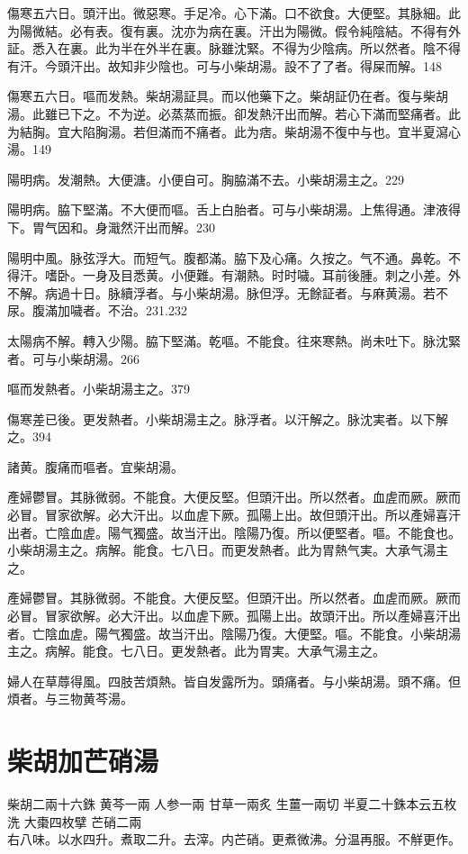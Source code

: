 傷寒五六日。頭汗出。微惡寒。手足冷。心下滿。口不欲食。大便堅。其脉細。此为陽微結。必有表。復有裏。沈亦为病在裏。汗出为陽微。假令純陰結。不得有外証。悉入在裏。此为半在外半在裏。脉雖沈緊。不得为少陰病。所以然者。陰不得有汗。今頭汗出。故知非少陰也。可与{\khaaitp 小}柴胡湯。設不了了者。得屎而解。148

傷寒五六日。嘔而发熱。柴胡湯証具。而以他藥下之。柴胡証仍在者。復与柴胡湯。此雖已下之。不为逆。必蒸蒸而振。卻发熱汗出而解。若心下滿而堅痛者。此为結胸。宜大陷胸湯。若但滿而不痛者。此为痞。柴胡{\khaaitp 湯}不復中与也。宜半夏瀉心湯。149

陽明病。发潮熱。大便溏。小便自可。胸脇滿不去。小柴胡湯主之。229

陽明病。脇下堅滿。不大便而嘔。舌上白胎者。可与小柴胡湯。上焦得通。津液得下。胃气因和。身濈然汗出而解。230

陽明中風。脉弦浮大。而短气。腹都滿。脇下及心痛。久按之。气不通。鼻乾。不得汗。嗜卧。一身及目悉黄。小便難。有潮熱。时时噦。耳前後腫。刺之小差。外不解。病過十日。脉續浮者。与{\khaaitp 小}柴胡湯。脉但浮。无餘証者。与麻黄湯。若不尿。腹滿加噦者。不治。231.232

太陽病不解。轉入少陽。脇下堅滿。乾嘔。不能食。往來寒熱。尚未吐下。脉沈緊者。可与小柴胡湯。266

嘔而发熱者。小柴胡湯主之。379

傷寒差已後。更发熱者。小柴胡湯主之。脉浮者。以汗解之。脉沈実者。以下解之。394

諸黄。腹痛而嘔者。宜柴胡湯。

產婦鬱{\khaaitp 冒}。其脉微弱。不能食。大便反堅。但頭汗出。所以然者。血虗而厥。厥而必冒。冒家欲解。必大汗出。以血虗下厥。孤陽上出。故但頭汗出。所以產婦喜汗出者。亡陰血虗。陽气獨盛。故当汗出。陰陽乃復。所以便堅者。嘔。不能食也。小柴胡湯主之。病解。能食。七八日。而更发熱者。此为胃熱气実。大承气湯主之。{\wuben}

產婦鬱冒。其脉微弱。不能食。大便反堅。但頭汗出。所以然者。血虗而厥。厥而必冒。冒家欲解。必大汗出。以血虗下厥。孤陽上出。故頭汗出。所以產婦喜汗出者。亡陰血虗。陽气獨盛。故当汗出。陰陽乃復。大便堅。嘔。不能食。小柴胡湯主之。病解。能食。七八日。更发熱者。此为胃実。大承气湯主之。{\dengben}

婦人在草蓐得風。四肢苦煩熱。皆自发露所为。頭痛者。与小柴胡湯。頭不痛。但煩者。与三物黄芩湯。

\section{柴胡加芒硝湯}

柴胡{\scriptsize 二兩十六銖} 黄芩{\scriptsize 一兩} 人参{\scriptsize 一兩} 甘草{\scriptsize 一兩炙} 生薑{\scriptsize 一兩切} 半夏{\scriptsize 二十銖本云五枚洗} 大棗{\scriptsize 四枚擘} 芒硝{\scriptsize 二兩}\\
右八味。以水四升。煮取二升。去滓。内芒硝。更煮微沸。分温再服。不觧更作。

